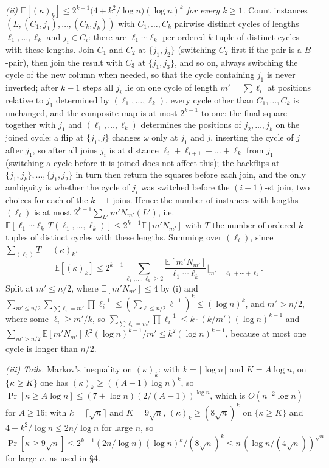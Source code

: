 \documentclass[11pt]{article}
\theoremstyle{remark}
\newcommand{\E}{\mathbb E}
\begin{document}
\emph{(ii) $\E[(\kappa)_k]\le2^{k-1}\bigl(4+k^2/\log n\bigr)(\log n)^k$ for every $k\ge1$.}
Count instances $(L,(C_1,j_1),\dots,(C_k,j_k))$ with $C_1,\dots,C_k$
pairwise distinct cycles of lengths $\ell_1,\dots,\ell_k$ and
$j_i\in C_i$: there are $\ell_1\cdots\ell_k$ per ordered $k$-tuple of
distinct cycles with these lengths.  Join $C_1$ and $C_2$ at
$\{j_1,j_2\}$ (switching $C_2$ first if the pair is a $B$-pair), then
join the result with $C_3$ at $\{j_1,j_3\}$, and so on, always switching
the cycle of the new column when needed, so that the cycle containing
$j_1$ is never inverted; after $k-1$ steps all $j_i$ lie on one cycle of
length $m'=\sum\ell_i$ at positions relative to $j_1$ determined by
$(\ell_1,\dots,\ell_k)$, every cycle other than $C_1,\dots,C_k$ is
unchanged, and the composite map is at most $2^{k-1}$-to-one: the
final square together with $j_1$ and $(\ell_1,\dots,\ell_k)$ determines
the positions of $j_2,\dots,j_k$ on the joined cycle: a flip at
$\{j_1,j\}$ changes $\omega$ only at $j_1$ and $j$, inserting the cycle
of $j$ after $j_1$, so after all joins $j_i$ is at distance
$\ell_i+\ell_{i+1}+\dots+\ell_k$ from $j_1$ (switching a cycle before
it is joined does not affect this); the backflips
at $\{j_1,j_k\},\dots,\{j_1,j_2\}$ in turn then return the squares
before each join, and the only ambiguity is whether the cycle of
$j_i$ was switched before the $(i-1)$-st join, two choices for each
of the $k-1$ joins.  Hence the
number of instances with lengths $(\ell_i)$ is at most
$2^{k-1}\sum_{L'}m'N_{m'}(L')$, i.e.
$\E[\ell_1\cdots\ell_k\,T(\ell_1,\dots,\ell_k)]\le2^{k-1}\E[m'N_{m'}]$
with $T$ the number of ordered $k$-tuples of distinct cycles with these
lengths.  Summing over $(\ell_i)$, since $\sum_{(\ell_i)}T=(\kappa)_k$,
\[
\E[(\kappa)_k]\le2^{k-1}\sum_{\ell_1,\dots,\ell_k\ge2}
\frac{\E[m'N_{m'}]}{\ell_1\cdots\ell_k}\Big|_{m'=\ell_1+\cdots+\ell_k}.
\]
Split at $m'\le n/2$, where $\E[m'N_{m'}]\le4$ by (i) and
$\sum_{m'\le n/2}\sum_{\sum\ell_i=m'}\prod\ell_i^{-1}\le(\sum_{\ell\le n/2}\ell^{-1})^k\le(\log n)^k$,
and $m'>n/2$, where some $\ell_i\ge m'/k$, so
$\sum_{\sum\ell_i=m'}\prod\ell_i^{-1}\le k\cdot(k/m')(\log n)^{k-1}$ and
$\sum_{m'>n/2}\E[m'N_{m'}]\,k^2(\log n)^{k-1}/m'\le k^2(\log n)^{k-1}$,
because at most one cycle is longer than $n/2$.

\emph{(iii) Tails.}  Markov's inequality on $(\kappa)_k$: with
$k=\lceil\log n\rceil$ and $K=A\log n$, on $\{\kappa\ge K\}$ one has
$(\kappa)_k\ge((A-1)\log n)^k$, so
$\Pr[\kappa\ge A\log n]\le(7+\log n)(2/(A-1))^{\log n}$, which is
$O(n^{-2}\log n)$ for $A\ge16$; with $k=\lceil\sqrt n\rceil$ and
$K=9\sqrt n$, $(\kappa)_k\ge(8\sqrt n)^k$ on $\{\kappa\ge K\}$ and
$4+k^2/\log n\le2n/\log n$ for large $n$, so
$\Pr[\kappa\ge9\sqrt n]\le2^{k-1}(2n/\log n)(\log n)^k/(8\sqrt n)^k
\le n\,(\log n/(4\sqrt n))^{\sqrt n}$ for large $n$, as used in \S4.
\end{document}

